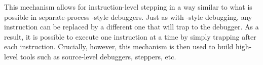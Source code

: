 This mechanism allows for instruction-level stepping in a way similar
to what is possible in separate-process \unix{}-style debuggers.  Just
as with \unix{}-style debugging, any instruction can be replaced by a
different one that will trap to the debugger.  As a result, it is
possible to execute one instruction at a time by simply trapping after
each instruction.  Crucially, however, this mechanism is then used to
build high-level tools such as source-level debuggers, steppers, etc.
